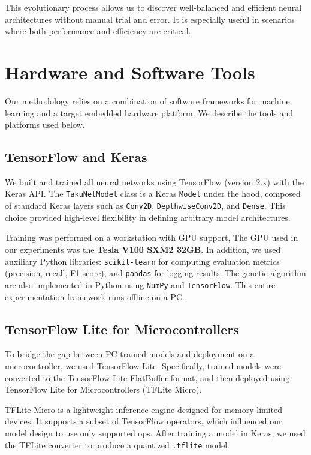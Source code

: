 This evolutionary process allows us to discover well-balanced and efficient neural architectures without manual trial and error. It is especially useful in scenarios where both performance and efficiency are critical.




\section{Hardware and Software Tools}

Our methodology relies on a combination of software frameworks for machine learning and a target embedded hardware platform. We describe the tools and platforms used below.

\subsection*{TensorFlow and Keras}

We built and trained all neural networks using TensorFlow (version 2.x) with the Keras API. The \texttt{TakuNetModel} class is a Keras \texttt{Model} under the hood, composed of standard Keras layers such as \texttt{Conv2D}, \texttt{DepthwiseConv2D}, and \texttt{Dense}. This choice provided high-level flexibility in defining arbitrary model architectures.

Training was performed on a workstation with GPU support, The GPU used in our experiments was the \textbf{Tesla V100 SXM2 32GB}.
In addition, we used auxiliary Python libraries: \texttt{scikit-learn} for computing evaluation metrics (precision, recall, F1-score), and \texttt{pandas} for logging results. The genetic algorithm are also implemented in Python using \texttt{NumPy} and \texttt{TensorFlow}. This entire experimentation framework runs offline on a PC.

\subsection*{TensorFlow Lite for Microcontrollers}

To bridge the gap between PC-trained models and deployment on a microcontroller, we used TensorFlow Lite. Specifically, trained models were converted to the TensorFlow Lite FlatBuffer format, and then deployed using TensorFlow Lite for Microcontrollers (TFLite Micro).

TFLite Micro is a lightweight inference engine designed for memory-limited devices. It supports a subset of TensorFlow operators, which influenced our model design to use only supported ops. After training a model in Keras, we used the TFLite converter to produce a quantized \texttt{.tflite} model.

